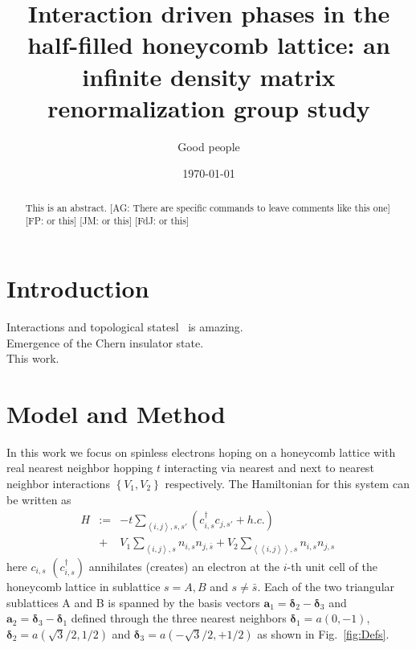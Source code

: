 \documentclass[aps,prx,10pt,twocolumn,floatfix,superscriptaddress,showpacs,numerical,footinbib]{revtex4-1}
\newcommand{\noteAG}[1]{{\color{blue} [AG: #1]}}
\newcommand{\noteFP}[1]{{\color{magenta} [FP: #1]}}
\newcommand{\noteJM}[1]{{\color{red} [JM: #1]}}
\newcommand{\noteFdJ}[1]{{\color{cyan} [FdJ: #1]}}
\newcommand{\bs}[1]{{\boldsymbol{#1}}}
\begin{document}
%
\title{Interaction driven phases in the half-filled honeycomb lattice: an infinite density matrix renormalization group study}
%
\author{Good people}
%
\date{\today}
%
\begin{abstract}
%
This is an abstract. \noteAG{There are specific commands to leave comments like this one}\noteFP{or this}\noteJM{or this}\noteFdJ{or this}
%
\end{abstract}
%
\maketitle
%

\section{Introduction}
%
Interactions and topological statesl~\cite{H88} is amazing.\\
%

%
Emergence of the Chern insulator state.\\
%

%
This work.\\


\section{Model and Method}
%
In this work we focus on spinless electrons hoping on a honeycomb lattice with real nearest neighbor hopping $t$ interacting via nearest and next to nearest neighbor interactions 
$\left\lbrace V_{1},V_{2}\right\rbrace$ respectively. 
%
The Hamiltonian for this system can be written as
\begin{eqnarray}
\nonumber
%
H&:=&-t\sum_{\left\langle i,j\right\rangle ,s,s'}(c^{\dagger}_{i,s}c_{j,s'}+h.c.)\\
%
\;&+&
V_{1}\sum_{\left\langle i,j\right\rangle ,s }n_{i,s}n_{j,\bar{s}}+
%
V_{2}\sum_{\left\langle \left\langle i,j\right\rangle \right\rangle ,s }n_{i,s}n_{j,s}\,
%
\label{eq:H}
%
\end{eqnarray}
%
here $c_{i,s}$ $(c^{\dagger}_{i,s})$  annihilates (creates) an electron at the $i$-th unit cell of the honeycomb lattice
in sublattice $s=A,B$ and $s\neq\bar{s}$. 
%
Each of the two triangular sublattices A and B is spanned by the basis vectors
$\bs{a}_{1}=\bs{\delta}_{2}-\bs{\delta}_{3}$ and 
$\bs{a}_{2}=\bs{\delta}_{3}-\bs{\delta}_{1}$ defined through the three nearest neighbors $\bs{\delta}_{1}=a(0,-1)$,  
$\bs{\delta}_{2}=a(\sqrt{3}/2,1/2)$ and $\bs{\delta}_{3}=a(-\sqrt{3}/2,+1/2)$ as shown in Fig.~\ref{fig:Defs}.\\
%
\end{document}
